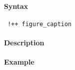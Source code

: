 


	\paragraph{Syntax}
 
 \begin{verbatim}
 !++ figure_caption
 \end{verbatim}
 
 \paragraph{Description}
 
 \paragraph{Example}


